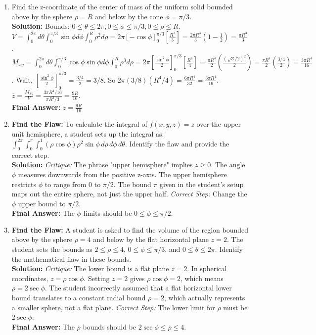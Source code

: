 \documentclass[11pt]{article}
\begin{document}
\begin{enumerate}[label=\textbf{\arabic*.}]
\item Find the z-coordinate of the center of mass of the uniform solid bounded above by the sphere $\rho=R$ and below by the cone $\phi=\pi/3$.\\
\textbf{Solution:}
Bounds: $0 \le \theta \le 2\pi, 0 \le \phi \le \pi/3, 0 \le \rho \le R$.
$V = \int_0^{2\pi} d\theta \int_0^{\pi/3} \sin\phi d\phi \int_0^R \rho^2 d\rho = 2\pi [-\cos\phi]_0^{\pi/3} [\frac{R^3}{3}] = \frac{2\pi R^3}{3} (1 - \frac{1}{2}) = \frac{\pi R^3}{3}$.
$M_{xy} = \int_0^{2\pi} d\theta \int_0^{\pi/3} \cos\phi\sin\phi d\phi \int_0^R \rho^3 d\rho = 2\pi [\frac{\sin^2\phi}{2}]_0^{\pi/3} [\frac{R^4}{4}] = \frac{\pi R^4}{2} (\frac{(\sqrt{3}/2)^2}{2}) = \frac{\pi R^4}{2} (\frac{3/4}{2}) = \frac{3\pi R^4}{16}$. Wait, $[\frac{\sin^2\phi}{2}]_0^{\pi/3} = \frac{3/4}{2} = 3/8$. So $2\pi (3/8) (R^4/4) = \frac{6\pi R^4}{32} = \frac{3\pi R^4}{16}$.
$\bar{z} = \frac{M_{xy}}{V} = \frac{3\pi R^4/16}{\pi R^3/3} = \frac{9R}{16}$.\\
\textbf{Final Answer:} $\bar{z} = \frac{9R}{16}$

\item \textbf{Find the Flaw:} To calculate the integral of $f(x,y,z) = z$ over the upper unit hemisphere, a student sets up the integral as:
$\int_0^{2\pi} \int_0^{\pi} \int_0^1 (\rho\cos\phi) \rho^2\sin\phi \,d\rho \,d\phi \,d\theta$.
Identify the flaw and provide the correct step.\\
\textbf{Solution:} 
\textit{Critique:} The phrase "upper hemisphere" implies $z \ge 0$. The angle $\phi$ measures downwards from the positive z-axis. The upper hemisphere restricts $\phi$ to range from $0$ to $\pi/2$. The bound $\pi$ given in the student's setup maps out the entire sphere, not just the upper half. 
\textit{Correct Step:} Change the $\phi$ upper bound to $\pi/2$.\\
\textbf{Final Answer:} The $\phi$ limits should be $0 \le \phi \le \pi/2$.

\item \textbf{Find the Flaw:} A student is asked to find the volume of the region bounded above by the sphere $\rho=4$ and below by the flat horizontal plane $z=2$. The student sets the bounds as $2 \le \rho \le 4$, $0 \le \phi \le \pi/3$, and $0 \le \theta \le 2\pi$. Identify the mathematical flaw in these bounds.\\
\textbf{Solution:} 
\textit{Critique:} The lower bound is a flat plane $z=2$. In spherical coordinates, $z = \rho\cos\phi$. Setting $z=2$ gives $\rho\cos\phi = 2$, which means $\rho = 2\sec\phi$. The student incorrectly assumed that a flat horizontal lower bound translates to a constant radial bound $\rho=2$, which actually represents a smaller sphere, not a flat plane. 
\textit{Correct Step:} The lower limit for $\rho$ must be $2\sec\phi$.\\
\textbf{Final Answer:} The $\rho$ bounds should be $2\sec\phi \le \rho \le 4$.


\end{enumerate}
\end{document}
